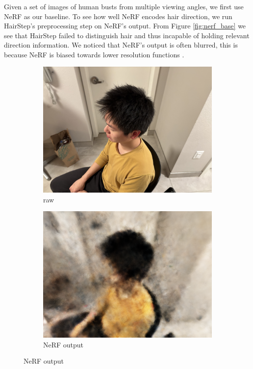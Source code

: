 \documentclass[12pt]{article}
\begin{document}
  Given a set of images of human busts from multiple viewing angles, we first use NeRF as our baseline. To see how well NeRF encodes hair direction, we run HairStep's preprocessing step on NeRF's output. From Figure \ref{fig:nerf_base} we see that HairStep failed to distinguish hair and thus incapable of holding relevant direction information. We noticed that NeRF's output is often blurred, this is because NeRF is biased towards lower resolution functions \cite{mildenhall_nerf_2020}.
  \begin{figure}[h]
        \centering
        \begin{subfigure}{0.3\textwidth}
            \centering
            \includegraphics[width=\textwidth]{project-milestone/images/portrait_raw/IMG_0342.png}
            \caption{raw}
        \end{subfigure}
        \quad
        \begin{subfigure}{0.3\textwidth}
            \centering
            \includegraphics[width=\textwidth]{project-milestone/images/nerf_pred/31.png}
            \caption{NeRF output}
        \end{subfigure}


\end{figure}
\end{document}
